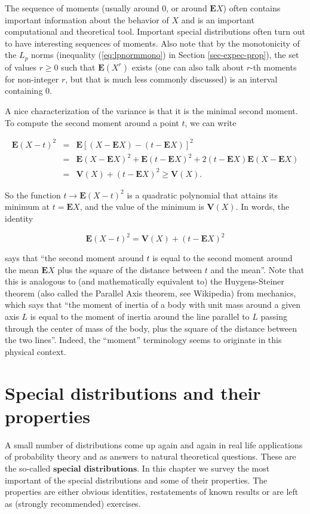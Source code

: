 \documentclass[11pt]{report}
\theoremstyle{plain}
\theoremstyle{definition}
\begin{document}
The sequence of moments (usually around 0, or around
$\mathbf{E} X$) often contains important information
about the behavior of $X$ and is an important
computational and theoretical tool. Important special
distributions often turn out to have interesting
sequences of moments. Also note that by the
monotonicity of the $L_p$ norms (inequality
(\ref{eq:lpnormmono}) in Section \ref{sec-expec-prop}), the
set of values $r\ge 0$ such that $\mathbf{E}(X^r)$
exists (one can also talk about $r$-th moments for
non-integer $r$, but that is much less commonly
discussed) is an interval containing $0$.

A nice characterization of the variance is that it is
the minimal second moment. To compute the second
moment around a point $t$, we can write

\begin{eqnarray*}
\mathbf{E}(X-t)^2 &=& \mathbf{E}[ (X-\mathbf{E} X)-(t-\mathbf{E} X)]^2 \\ &=& \mathbf{E}(X-\mathbf{E} X)^2 + \mathbf{E}(t-\mathbf{E} X)^2 + 2(t-\mathbf{E} X) \mathbf{E}(X-\mathbf{E} X) \\
&=& \mathbf{V}(X) + (t-\mathbf{E} X)^2 \ge \mathbf{V}(X).
\end{eqnarray*}

So the function $t\to\mathbf{E}(X-t)^2$ is a
quadratic polynomial that attains its minimum at
$t=\mathbf{E} X$, and the value of the minimum is
$\mathbf{V}(X)$. In words, the identity

\[
\mathbf{E}(X-t)^2 = \mathbf{V}(X) + (t-\mathbf{E} X)^2
\]

says that ``the second moment around $t$ is equal to
the second moment around the mean $\mathbf{E} X$ plus
the square of the distance between $t$ and the
mean''. Note that this is analogous to (and
mathematically equivalent to) the Huygens-Steiner
theorem (also called the Parallel Axis theorem, see
Wikipedia) from mechanics, which says that ``the
moment of inertia of a body with unit mass around a
given axis $L$ is equal to the moment of inertia
around the line parallel to $L$ passing through the
center of mass of the body, plus the square of the
distance between the two lines''. Indeed, the
``moment'' terminology seems to originate in this
physical context.

\chapter{Special distributions and their properties}
A small number of distributions come up again and
again in real life applications of probability theory
and as answers to natural theoretical questions. These
are the so-called $\textbf{special distributions}$.
In this chapter we survey the most important of the
special distributions and some of their properties.
The properties are either obvious identities,
restatements of known results or are left as
(strongly recommended) exercises.
\end{document}
